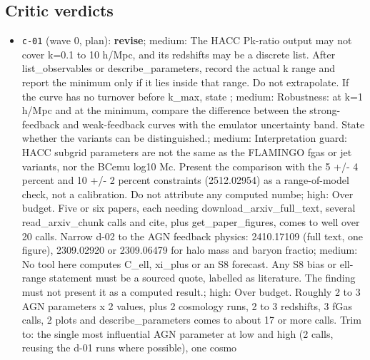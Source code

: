 \documentclass[11pt,a4paper]{article}
\begin{document}
\subsection{Critic verdicts}
\begin{itemize}
  \item \texttt{c-01} (wave 0, plan): \textbf{revise}; medium: The HACC Pk-ratio output may not cover k=0.1 to 10 h/Mpc, and its redshifts may be a discrete list. After list\_observables or describe\_parameters, record the actual k range and report the minimum only if it lies inside that range. Do not extrapolate. If the curve has no turnover before k\_max, state ; medium: Robustness: at k=1 h/Mpc and at the minimum, compare the difference between the strong-feedback and weak-feedback curves with the emulator uncertainty band. State whether the variants can be distinguished.; medium: Interpretation guard: HACC subgrid parameters are not the same as the FLAMINGO fgas or jet variants, nor the BCemu log10 Mc. Present the comparison with the 5 +/- 4 percent and 10 +/- 2 percent constraints (2512.02954) as a range-of-model check, not a calibration. Do not attribute any computed numbe; high: Over budget. Five or six papers, each needing download\_arxiv\_full\_text, several read\_arxiv\_chunk calls and cite, plus get\_paper\_figures, comes to well over 20 calls. Narrow d-02 to the AGN feedback physics: 2410.17109 (full text, one figure), 2309.02920 or 2309.06479 for halo mass and baryon fractio; medium: No tool here computes C\_ell, xi\_plus or an S8 forecast. Any S8 bias or ell-range statement must be a sourced quote, labelled as literature. The finding must not present it as a computed result.; high: Over budget. Roughly 2 to 3 AGN parameters x 2 values, plus 2 cosmology runs, 2 to 3 redshifts, 3 fGas calls, 2 plots and describe\_parameters comes to about 17 or more calls. Trim to: the single most influential AGN parameter at low and high (2 calls, reusing the d-01 runs where possible), one cosmo

\end{itemize}
\end{document}
